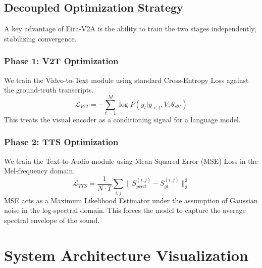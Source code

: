 \documentclass[conference, onecolumn]{IEEEtran}
\begin{document}
\subsection{Decoupled Optimization Strategy}
A key advantage of Eira-V2A is the ability to train the two stages independently, stabilizing convergence.

\subsubsection{Phase 1: V2T Optimization}
We train the Video-to-Text module using standard Cross-Entropy Loss against the ground-truth transcripts.
\[
\mathcal{L}_{V2T} = - \sum_{t=1}^{M} \log P(y_t | y_{<t}, V; \theta_{v2t})
\]
This treats the visual encoder as a conditioning signal for a language model.

\subsubsection{Phase 2: TTS Optimization}
We train the Text-to-Audio module using Mean Squared Error (MSE) Loss in the Mel-frequency domain.
\[
\mathcal{L}_{TTS} = \frac{1}{N \cdot T} \sum_{i,j} \| S_{pred}^{(i,j)} - S_{gt}^{(i,j)} \|_2^2
\]
MSE acts as a Maximum Likelihood Estimator under the assumption of Gaussian noise in the log-spectral domain. This forces the model to capture the average spectral envelope of the sound.

\section{System Architecture Visualization}
\end{document}
